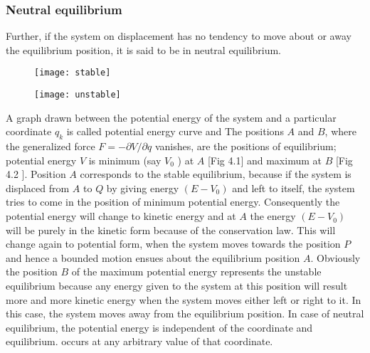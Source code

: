 \subsubsection{Neutral equilibrium}
 Further, if the system on displacement has no tendency to move about or away the equilibrium position, it is said to be in neutral equilibrium.\\
 \begin{minipage}{0.5\textwidth}
 \begin{figure}[H]
 	\centering
 	\texttt{[image: stable]}
 	\caption{}
 	\label{}
 \end{figure}
 \end{minipage}
\begin{minipage}{0.5\textwidth}
\begin{figure}[H]
	\centering
	\texttt{[image: unstable]}
	\caption{}
	\label{}
\end{figure}
\end{minipage}
A graph drawn between the potential energy of the system and a particular coordinate $q_{k}$ is called potential energy curve and  The positions $A$ and $B$, where the generalized force $F=-\partial V / \partial q$ vanishes, are the positions of equilibrium; potential energy $V$ is minimum (say $V_{0}$ ) at $A$ [Fig 4.1] and maximum at $B$ [Fig 4.2 ]. Position $A$ corresponds to the stable equilibrium, because if the system is displaced from $A$ to $Q$ by giving energy $\left(E-V_{0}\right)$ and left to itself, the system tries to come in the position of minimum potential energy. Consequently the potential energy will change to kinetic energy and at $A$ the energy $\left(E-V_{0}\right)$ will be purely in the kinetic form because of the conservation law. This will change again to potential form, when the system moves towards the position $P$ and hence a bounded motion ensues about the equilibrium position $A$. Obviously the position $B$ of the maximum potential energy represents the unstable equilibrium because any energy given to the system at this position will result more and more kinetic energy when the system moves either left or right to it. In this case, the system moves away from the equilibrium position. In case of neutral equilibrium, the potential energy is independent of the coordinate and equilibrium. occurs at any arbitrary value of that coordinate.
